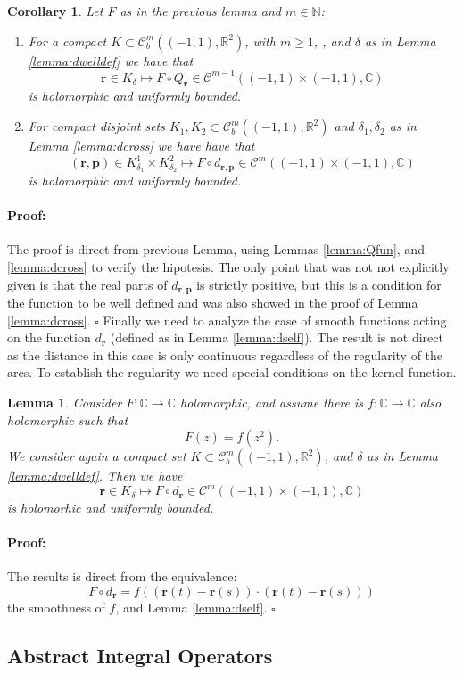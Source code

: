 \documentclass{article}
\newtheorem{lemma}[theorem]{Lemma}
\newtheorem{corollary}[theorem]{Corollary}
\newenvironment{proof}{\paragraph{Proof:}}{\hfill$\square$}
\newcommand{\IC}{{\mathbb C}}
\newcommand{\IN}{{\mathbb N}}
\newcommand{\IR}{{\mathbb R}}
\newcommand{\bp}{{\bm p}}
\newcommand{\cmspace}[3]{\mathcal{C}^{#1} \left( #2, #3 \right)}
\newcommand{\rgeo}[1]{\mathcal{C}_b^{#1}\left( (-1,1), \IR^2 \right)}
\newcommand{\br}{\bm{r}}
\begin{document}
\begin{corollary}
\label{cor:smoothcomp}
Let $F$ as in the previous lemma and $m \in \IN$: 
\begin{enumerate}
\item 
For a compact $K \subset \rgeo{m}$, with $m \geq 1$, , and $\delta$ as in Lemma \ref{lemma:dwelldef} we have that 
$$\br \in K_\delta \mapsto F \circ Q_{\br} \in \cmspace{m-1}{(-1,1)\times(-1,1)}{\IC}$$
is holomorphic and uniformly bounded. 
\item 
For compact disjoint sets $K_1,K_2 \subset  \rgeo{m}$ and $\delta_1, \delta_2$ as in Lemma \ref{lemma:dcross} we have have that 
$$(\br,\bp) \in K^1_{\delta_1} \times K^2_{\delta_2} \mapsto F \circ d_{\br,\bp} \in \cmspace{m}{(-1,1)\times(-1,1)}{\IC}$$
is holomorphic and uniformly bounded.
\end{enumerate}
\end{corollary}
\begin{proof}
The proof is direct from previous Lemma, using Lemmas \ref{lemma:Qfun}, and \ref{lemma:dcross} to verify the hipotesis. The only point that was not not explicitly given is that the real parts of $d_{\br,\bp}$ is strictly positive, but this is a condition for the function to be well defined and was also showed in the proof of Lemma \ref{lemma:dcross}.
\end{proof}
Finally we need to analyze the case of smooth functions acting on the function $d_{\br}$ (defined as in Lemma \ref{lemma:dself}). The result is not direct as the distance in this case is only continuous regardless of the regularity of the arcs. To establish the regularity we need special conditions on the kernel function. 
\begin{lemma}
\label{lemma:selfkernell}
Consider $F :\IC \rightarrow \IC$ holomorphic, and assume there is $f : \IC \rightarrow \IC$ also holomorphic such that
$$F(z) = f(z^2).$$ 
We consider again a compact set $K \subset \rgeo{m}$, and $\delta$ as in Lemma \ref{lemma:dwelldef}. Then we have 
$$\br \in K_\delta \mapsto F\circ d_{\br} \in \cmspace{m}{(-1,1)\times(-1,1)}{\IC}$$
is holomorhic and uniformly bounded. 
\end{lemma}
\begin{proof}
The results is direct from the equivalence: $$F\circ d_{\br} = f( (\br(t)-\br(s)) \cdot (\br(t)-\br(s)))$$ the smoothness of $f$, and Lemma \ref{lemma:dself}. 
\end{proof}

\subsection{Abstract Integral Operators}
\end{document}
